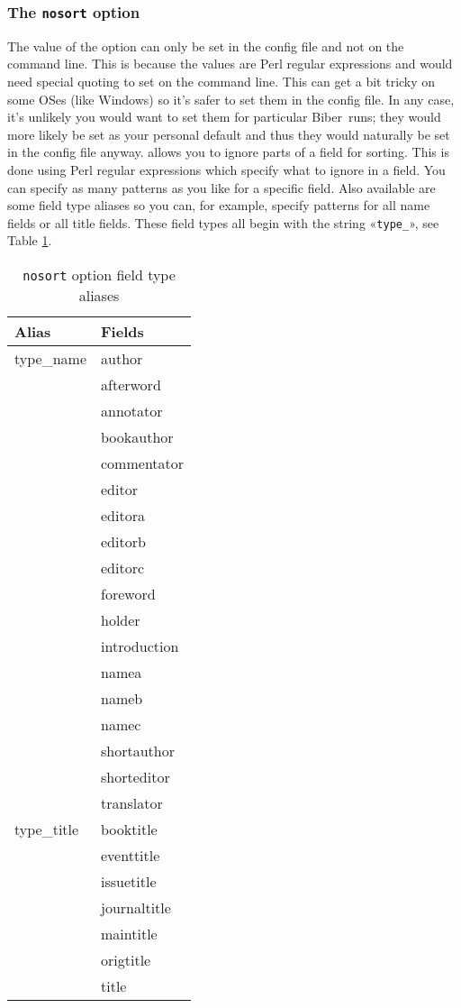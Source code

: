 \documentclass{ltxdockit}
\newcommand*{\biber}{Biber\xspace}
\begin{document}
\subsubsection{The \texttt{nosort} option}\label{nosort}

The value of the  option can only be set in the config file
and not on the command line. This is because the values are Perl regular
expressions and would need special quoting to set on the command line. This
can get a bit tricky on some OSes (like Windows) so it's safer to set them
in the config file. In any case, it's unlikely you would want to set them
for particular \biber\ runs; they would more likely be set as your
personal default and thus they would naturally be set in the config file
anyway.  allows you to ignore parts of a field for sorting.
This is done using Perl regular expressions which specify what to
ignore in a field. You can specify as many patterns as you like for a
specific field. Also available are some field type aliases so you can, for
example, specify patterns for all name fields or all title fields. These
field types all begin with the string «\verb+type_+», see Table
\ref{tab:nst}.

\begin{table}
\begin{center}
\small
\begin{tabular}{ll}
\toprule
Alias & Fields\\
\midrule
type\_name & author\\
          & afterword\\
          & annotator\\
          & bookauthor\\
          & commentator\\
          & editor\\
          & editora\\
          & editorb\\
          & editorc\\
          & foreword\\
          & holder\\
          & introduction\\
          & namea\\
          & nameb\\
          & namec\\
          & shortauthor\\
          & shorteditor\\
          & translator\\
type\_title & booktitle\\
           & eventtitle\\
           & issuetitle\\
           & journaltitle\\
           & maintitle\\
           & origtitle\\
           & title\\
\bottomrule
\end{tabular}
\end{center}
\caption{\texttt{nosort} option field type aliases}
\label{tab:nst}
\end{table}
\end{document}
